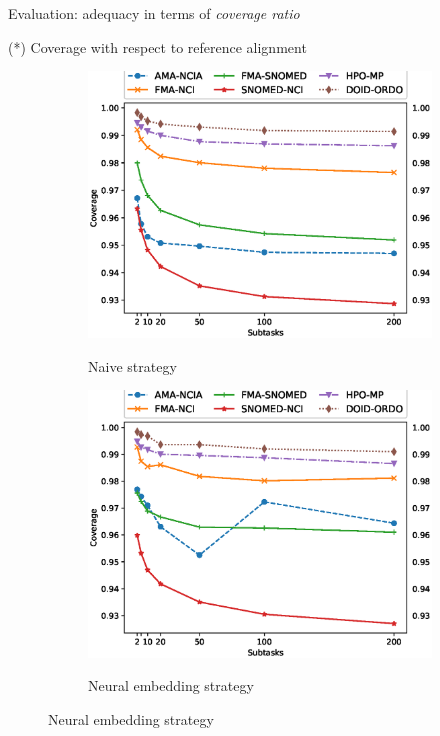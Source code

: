 \documentclass[t]{beamer}
\begin{document}
\begin{frame}{Evaluation: adequacy in terms of \emph{coverage ratio} }

\vspace{-0.1cm}
{\footnotesize (*) Coverage with respect to reference alignment}

	\begin{figure}[t]
    \centering
    \begin{subfigure}[b]{0.495\textwidth}
        \centering
        \includegraphics[width=\textwidth]{figures/coverages.eps}\\[-1ex]
        \caption{Naive strategy}
        \label{fig:coverageN}
    \end{subfigure}
    \begin{subfigure}[b]{0.495\textwidth}
        \centering
        \includegraphics[width=\textwidth]{figures/coverages_advanced.eps}\\[-1ex]
        \caption{Neural embedding strategy}
        \label{fig:coverageA}
    \end{subfigure}
 \end{figure}

  	
\end{frame}
\end{document}
